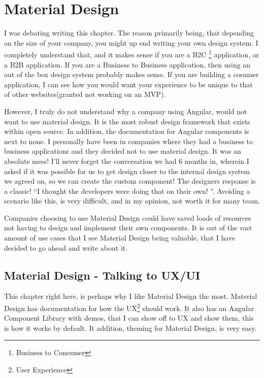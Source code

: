 
\chapter{ Material Design }

I was debating writing this chapter. The reason primarily being, that depending
on the size of your company, you might up end writing your own design system. I
completely understand that, and it makes sense if you are a B2C
\footnote{Business to Consumer} application, or a B2B application. If you are a
Business to Business application, then using an out of the box design system
probably makes sense. If you are building a cosumer application, I can see how
you would want your experience to be unique to that of other websites(granted
not working on an MVP).

However, I truly do not understand why a company using Angular, would not want
to use material design. It is the most robust design framework that exists
within open source. In addition, the documentation for Angular components is
next to none. I personally have been in companies where they had a business
to business applications and they decided not to use material design. It was an
absolute mess! I'll never forget the conversation we had 6 months in, wherein I
asked if it was possible for us to get design closer to the internal design
system we agreed on, so we can create the custom component! The designers
response is a classic! ``I thought the developers were doing that on their own!
''. Avoiding a scenario like this, is very difficult, and in my opinion, not
worth it for many team.

Companies choosing to use Material Design could have saved loads of resources
not having to design and implement their own components. It is out of the vast
amount of use cases that I see Material Design being valuable, that I have
decided to go ahead and write about it.

\section{ Material Design - Talking to UX/UI }
This chapter right here, is perhaps why I like Material Design the most.
Material Design has documentation for how the UX\footnote{User Experience}
should work. It also has an Angular Component Library with demos, that I can
show off to UX and show them, this is how it works by default. It addition,
theming for Material Design, is very easy.

